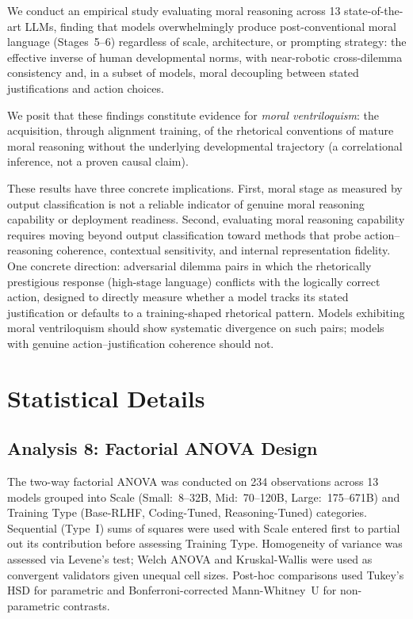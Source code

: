 \documentclass{article}
\begin{document}
We conduct an empirical study evaluating moral reasoning across 13 state-of-the-art LLMs, finding that models overwhelmingly produce post-conventional moral language (Stages~5--6) regardless of scale, architecture, or prompting strategy: the effective inverse of human developmental norms, with near-robotic cross-dilemma consistency and, in a subset of models, moral decoupling between stated justifications and action choices.

We posit that these findings constitute evidence for \emph{moral ventriloquism}: the acquisition, through alignment training, of the rhetorical conventions of mature moral reasoning without the underlying developmental trajectory (a correlational inference, not a proven causal claim).

These results have three concrete implications. First, moral stage as measured by output classification is not a reliable indicator of genuine moral reasoning capability or deployment readiness. Second, evaluating moral reasoning capability requires moving beyond output classification toward methods that probe action--reasoning coherence, contextual sensitivity, and internal representation fidelity. One concrete direction: adversarial dilemma pairs in which the rhetorically prestigious response (high-stage language) conflicts with the logically correct action, designed to directly measure whether a model tracks its stated justification or defaults to a training-shaped rhetorical pattern. Models exhibiting moral ventriloquism should show systematic divergence on such pairs; models with genuine action--justification coherence should not.




\appendix

\section{Statistical Details}
\label{app:stats}

\subsection{Analysis 8: Factorial ANOVA Design}
\label{app:anova}

The two-way factorial ANOVA was conducted on 234 observations across 13 models grouped into Scale (Small:~8--32B, Mid:~70--120B, Large:~175--671B) and Training Type (Base-RLHF, Coding-Tuned, Reasoning-Tuned) categories. Sequential (Type~I) sums of squares were used with Scale entered first to partial out its contribution before assessing Training Type. Homogeneity of variance was assessed via Levene's test; Welch ANOVA and Kruskal-Wallis were used as convergent validators given unequal cell sizes. Post-hoc comparisons used Tukey's HSD for parametric and Bonferroni-corrected Mann-Whitney~U for non-parametric contrasts.
\end{document}
